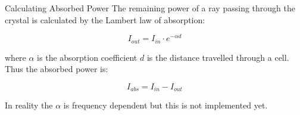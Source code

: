 \documentclass[aspectratio=43,t]{beamer}
\begin{document}
		\begin{frame}[fragile]{Calculating Absorbed Power}
			The remaining power of a ray passing through the crystal is calculated by
			the Lambert law of absorption:

			\begin{equation*}
				I_{out} = I_{in} \cdot e^{-\alpha d}
			\end{equation*}

			where $\alpha$ is the absorption coefficient $d$ is the distance travelled
			through a cell.\\
			Thus the absorbed power is:

			\begin{equation*}
				I_{abs} = I_{in} - I_{out}
			\end{equation*}

			In reality the $\alpha$ is frequency dependent but this is not implemented yet.
    \end{frame}
\end{document}
